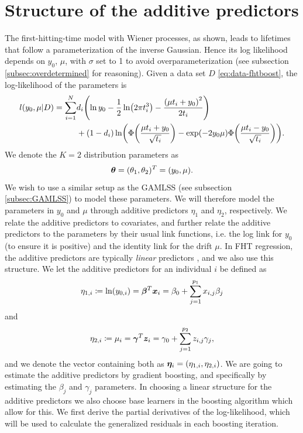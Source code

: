 \section{Structure of the additive predictors}
The first-hitting-time model with Wiener processes, as shown, leads to lifetimes that follow a parameterization of the inverse Gaussian.
Hence its log likelihood depends on $y_0$, $\mu$, with $\sigma$ set to 1 to avoid overparameterization (see subsection \ref{subsec:overdetermined} for reasoning).
Given a data set $D$ \eqref{eq:data-fhtboost}, the log-likelihood of the parameters is
\begin{align*}
\begin{split}
    l(y_0,\mu|D)=\sum_{i=1}^N&d_i\p*{\ln y_0-\frac{1}{2}\ln\p*{2\pi\ti^3}-\frac{\p*{\mu\ti+y_0}^2}{2\ti}} \\
    &+
    (1-d_i)\ln\p*{\Phi\p*{\frac{\mu\ti+y_0}{\sqrt{\ti}}}-\exp\p*{-2y_0\mu}\Phi\p*{\frac{\mu\ti-y_0}{\sqrt{\ti}}}}.
\end{split}
\end{align*}
We denote the $K=2$ distribution parameters as
\begin{equation*}
    \boldsymbol{\theta}=(\theta_1,\theta_2)^T=(y_0,\mu).
\end{equation*}
We wish to use a similar setup as the GAMLSS (see subsection \ref{subsec:GAMLSS}) to model these parameters.
We will therefore model the parameters in $y_0$ and $\mu$ through additive predictors $\eta_1$ and $\eta_2$, respectively.
We relate the additive predictors to covariates, and further relate the additive predictors to the parameters by their usual link functions, i.e. the log link for $y_0$ (to ensure it is positive) and the identity link for the drift $\mu$.
In FHT regression, the additive predictors are typically \textit{linear} predictors \citep{leewhitmore2006}, and we also use this structure.
We let the additive predictors for an individual $i$ be defined as
\begin{equation}\label{eq:eta1}
    \eta_{1,i}\coloneqq \ln(y_{0,i})=\boldsymbol{\beta}^T \bm{x}_i=\beta_{0}+\sum_{j=1}^{p_1}x_{i,j}\beta_j
\end{equation}
and
\begin{equation}\label{eq:eta2}
    \eta_{2,i}\coloneqq \mu_{i}=\boldsymbol{\gamma}^T \bm{z}_i=\gamma_{0}+\sum_{j=1}^{p_2}z_{i,j}\gamma_j,
\end{equation}
and we denote the vector containing both as $\boldsymbol{\eta}_i=\left(\eta_{1,i},\eta_{2,i}\right)$.
We are going to estimate the additive predictors by gradient boosting, and specifically by estimating the $\beta_j$ and $\gamma_j$ parameters.
In choosing a linear structure for the additive predictors we also choose base learners in the boosting algorithm which allow for this.
We first derive the partial derivatives of the log-likelihood, which will be used to calculate the generalized residuals in each boosting iteration.

